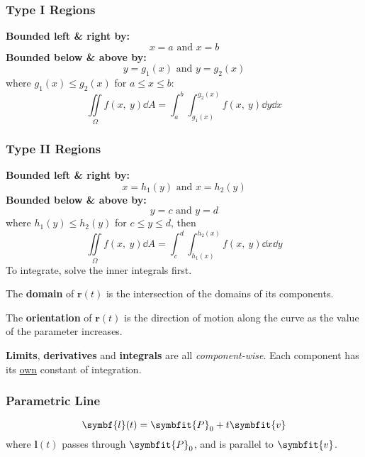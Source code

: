 \documentclass{article}
\begin{document}
\begin{multicols}{3}
    \subsubsection*{Type I Regions}
    \textbf{Bounded left \& right by:}
    \begin{equation*}
        x=a \text{ and } x=b
    \end{equation*}
    \textbf{Bounded below \& above by:}
    \begin{equation*}
        y=g_1(x) \text{ and } y=g_2(x)
    \end{equation*}
    where $g_1(x) \leq g_2(x)$ for $a \leq x \leq b$:
    \begin{equation*}
        \iint\limits_{\Omega} f(x,\: y) \dd{A} = \int_a^b\int_{g_1(x)}^{g_2(x)} f(x,\: y) \dd{y} \dd{x}
    \end{equation*}
    \subsubsection*{Type II Regions}
    \textbf{Bounded left \& right by:}
    \begin{equation*}
        x=h_1(y) \text{ and } x=h_2(y)
    \end{equation*}
    \textbf{Bounded below \& above by:}
    \begin{equation*}
        y=c \text{ and } y=d
    \end{equation*}
    where $h_1(y) \leq h_2(y)$ for $c \leq y \leq d$, then
    \begin{equation*}
        \iint\limits_{\Omega} f(x,\: y) \dd{A} = \int_c^d\int_{h_1(x)}^{h_2(x)} f(x,\: y) \dd{x} \dd{y}
    \end{equation*}
    To integrate, solve the inner integrals first.

    The \textbf{domain} of $\symbf{r}(t)$ is the intersection of the domains
    of its components.

    The \textbf{orientation} of $\symbf{r}(t)$ is the direction of motion along the
    curve as the value of the parameter increases.

    \textbf{Limits}, \textbf{derivatives} and \textbf{integrals} are all \textit{component-wise}. Each component has its \underline{own} constant of integration.
    \subsubsection*{Parametric Line}
    \begin{equation*}
        \symbf{l}(t) = \symbfit{P}_0 + t\symbfit{v}
    \end{equation*}
    where $\symbf{l}(t)$ passes through $\symbfit{P}_0$, and is parallel to $\symbfit{v}$.

\end{multicols}
\end{document}
